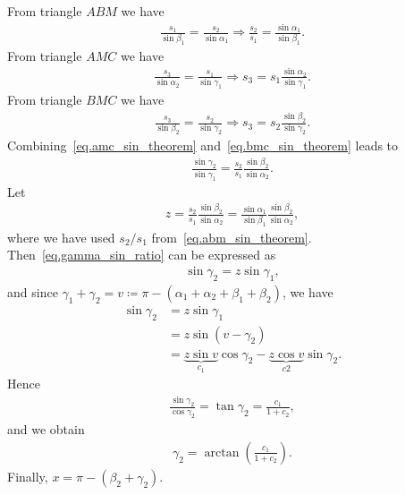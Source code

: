 \documentclass[12pt,a4paper]{article}
\begin{document}
From triangle $ABM$ we have
\begin{align} \label{eq.abm_sin_theorem}
  \frac{s_1}{\sin \beta_1} = \frac{s_2}{\sin \alpha_1} \Rightarrow \frac{s_2}{s_1} = \frac{\sin\alpha_1}{\sin\beta_1}.
\end{align}
%
From triangle $AMC$ we have
\begin{align} \label{eq.amc_sin_theorem}
  \frac{s_3}{\sin \alpha_2} = \frac{s_1}{\sin \gamma_1} \Rightarrow s_3 = s_1\frac{\sin\alpha_2}{\sin\gamma_1}.
\end{align}
%
From triangle $BMC$ we have
\begin{align} \label{eq.bmc_sin_theorem}
  \frac{s_3}{\sin \beta_2} = \frac{s_2}{\sin \gamma_2} \Rightarrow s_3 = s_2\frac{\sin\beta_2}{\sin\gamma_2}.
\end{align}
%
Combining~\eqref{eq.amc_sin_theorem} and~\eqref{eq.bmc_sin_theorem} leads to
\begin{align} \label{eq.gamma_sin_ratio}
  \frac{\sin\gamma_2}{\sin \gamma_1} = \frac{s_2}{s_1} \frac{\sin\beta_2}{\sin\alpha_2}.
\end{align}
%
Let
%
\begin{align*}
  z = \frac{s_2}{s_1} \frac{\sin\beta_2}{\sin\alpha_2} = \frac{\sin\alpha_1}{\sin\beta_1} \frac{\sin\beta_2}{\sin\alpha_2},
\end{align*}
where we have used $s_2/s_1$ from~\eqref{eq.abm_sin_theorem}. Then~\eqref{eq.gamma_sin_ratio} can be expressed as
\begin{align} \label{eq.gamma_sin_ratio}
  \sin\gamma_2 = z \sin \gamma_1,
\end{align}
%
and since $\gamma_1 + \gamma_2 = v \coloneqq \pi - (\alpha_1 + \alpha_2 + \beta_1 + \beta_2)$, we have
\begin{align}
  \sin\gamma_2 &= z \sin \gamma_1 \\
  &= z\sin(v - \gamma_2)\\
  &= \underbrace{z\sin v}_{c_1} \cos\gamma_2 - \underbrace{z\cos v}_{c2} \sin\gamma_2.
\end{align}
%
Hence
%
\begin{align}
  \frac{\sin \gamma_2}{\cos \gamma_2} = \tan \gamma_2 = \frac{c_1}{1 + c_2},
\end{align}
%
and we obtain
%
\begin{align}
  \gamma_2 = \arctan\left(\frac{c_1}{1 + c_2}\right).
\end{align}
%
Finally, $x = \pi - (\beta_2 + \gamma_2)$.

\nocite{*}


\end{document}
